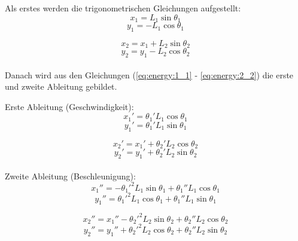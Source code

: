 \documentclass[12pt]{article}
\numberwithin{equation}{subsection}
\begin{document}
Als erstes werden die trigonometrischen Gleichungen aufgestellt:
\begin{equation} \label{eq:energy:1_1}
	x_1 = L_1\sin\theta_1
\end{equation}
\begin{equation} \label{eq:energy:1_2}
	y_1 = -L_1\cos\theta_1
\end{equation}

\begin{equation} \label{eq:energy:2_1}
	x_2 = x_1 + L_2\sin\theta_2
\end{equation}
\begin{equation} \label{eq:energy:2_2}
	y_2 = y_1 - L_2\cos\theta_2
\end{equation}
\
\\
Danach wird aus den Gleichungen (\ref{eq:energy:1_1} - \ref{eq:energy:2_2}) die erste und zweite Ableitung gebildet.

Erste Ableitung (Geschwindigkeit):
\begin{equation} \label{eq:velocity:1_1}
	x_1' = \theta_1' L_1\cos\theta_1
\end{equation}
\begin{equation} \label{eq:velocity:1_2}
	y_1' = \theta_1' L_1\sin\theta_1
\end{equation}

\begin{equation} \label{eq:velocity:2_1}
	x_2' = x_1' + \theta_2' L_2\cos\theta_2
\end{equation}
\begin{equation} \label{eq:velocity:2_2}
	y_2' = y_1' + \theta_2' L_2\sin\theta_2
\end{equation}
\
\\
Zweite Ableitung (Beschleunigung):
\begin{equation} \label{eq:acceleration:1_1}
	x_1'' = -{\theta_1'}^2 L_1 \sin\theta_1 + \theta_1'' L_1 \cos\theta_1
\end{equation}
\begin{equation} \label{eq:acceleration:1_2}
	y_1'' = {\theta_1'}^2 L_1 \cos\theta_1 + \theta_1'' L_1 \sin\theta_1
\end{equation}

\begin{equation} \label{eq:acceleration:2_1}
	x_2'' = x_1'' - {\theta_2'}^2 L_2\sin\theta_2 + \theta_2'' L_2 \cos\theta_2
\end{equation}
\begin{equation} \label{eq:acceleration:2_2}
	y_2'' = y_1'' + {\theta_2'}^2 L_2\cos\theta_2 + \theta_2'' L_2 \sin\theta_2
\end{equation}
\end{document}
